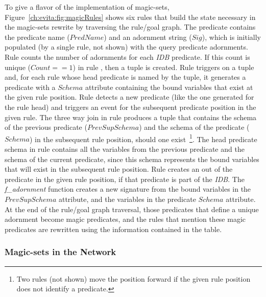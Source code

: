 To give a flavor of the \OVERLOG implementation of magic-sets,
Figure~\ref{ch:evita:fig:magicRules} shows six rules that build the state
necessary in the magic-sets rewrite by traversing the rule/goal graph. 
The  predicate contains the predicate name ($PredName$) and an
adornment string ($Sig$), which is initially populated (by a single rule, not shown) with
the query predicate adornments. Rule  counts the number of
adornments for each {\em IDB} predicate. If this count is unique ($Count == 1$) in rule ,
then a  tuple is created. Rule  triggers on a  tuple and, for each
rule whose head predicate is named by the  tuple, it generates a  predicate
with a $Schema$ attribute containing the bound variables that exist at the given rule position. 
Rule  detects a new  predicate (like the one generated for the rule head) and triggers 
an event for the subsequent  predicate position in the given rule. The three way join in rule  
produces a tuple that contains the schema of the previous  predicate ($PrevSupSchema$) 
and the schema of the predicate ($Schema$) in the subsequent rule position, should one 
exist~\footnote{Two rules (not shown) move the  position forward if the given rule position does 
not identify a predicate.}. The head  predicate schema in rule  contains all the variables from the 
previous  predicate and the schema of the current predicate, since this schema represents the bound variables
that will exist in the subsequent rule position. Rule  creates an  out of the predicate 
in the given rule position, if that predicate is part of the {\em IDB}. The {\em f\_adornment} 
function creates a new signature from the bound variables in the $PrevSupSchema$ attribute, 
and the variables in the predicate $Schema$ attribute. At the end of the rule/goal graph traversal, 
those predicates that define a unique adornment become magic predicates, and the rules that mention 
these magic predicates are rewritten using the information contained in the  table.

\subsubsection{Magic-sets in the Network}

